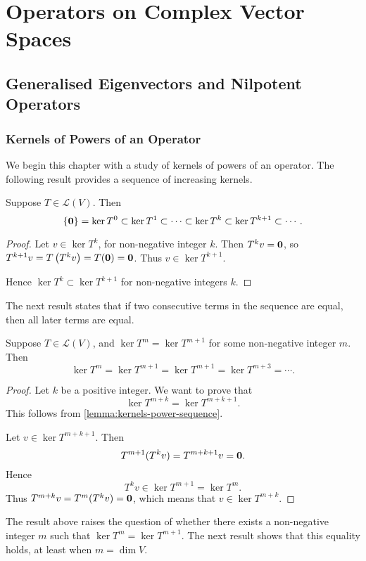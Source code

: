 \chapter{Operators on Complex Vector Spaces}
\section{Generalised Eigenvectors and Nilpotent Operators}
\subsection{Kernels of Powers of an Operator}
We begin this chapter with a study of kernels of powers of an operator.
The following result provides a sequence of increasing kernels.

\begin{lemma}\label{lemma:kernels-power-sequence}
Suppose $T\in\mathcal{L}(V)$. Then
\[\{\vb{0}\}=\ker T^0\subset\ker T^1\subset\cdots\subset\ker T^k\subset\ker T^{k+1}\subset\cdots.\]
\end{lemma}

\begin{proof}
Let $v\in\ker T^k$, for non-negative integer $k$. Then $T^k v=\vb{0}$, so $T^{k+1}v=T\left(T^k v\right)=T(\vb{0})=\vb{0}$. Thus $v\in\ker T^{k+1}$.

Hence $\ker T^k\subset\ker T^{k+1}$ for non-negative integers $k$.
\end{proof}

The next result states that if two consecutive terms in the sequence are equal, then all later terms are equal.

\begin{lemma}\label{lemma:kernels-power-sequence-equality}
Suppose $T\in\mathcal{L}(V)$, and $\ker T^m=\ker T^{m+1}$ for some non-negative integer $m$. Then
\[\ker T^m=\ker T^{m+1}=\ker T^{m+1}=\ker T^{m+3}=\cdots.\]
\end{lemma}

\begin{proof}
Let $k$ be a positive integer. We want to prove that
\[\ker T^{m+k}=\ker T^{m+k+1}.\]
\fbox{$\subset$} This follows from \ref{lemma:kernels-power-sequence}.

\fbox{$\supset$} Let $v\in\ker T^{m+k+1}$. Then
\[T^{m+1}(T^k v)=T^{m+k+1}v=\vb{0}.\]
Hence
\[T^k v\in\ker T^{m+1}=\ker T^m.\]
Thus $T^{m+k}v=T^m(T^k v)=\vb{0}$, which means that $v\in\ker T^{m+k}$.
\end{proof}

The result above raises the question of whether there exists a non-negative integer $m$ such that $\ker T^m=\ker T^{m+1}$. 
The next result shows that this equality holds, at least when $m=\dim V$.

